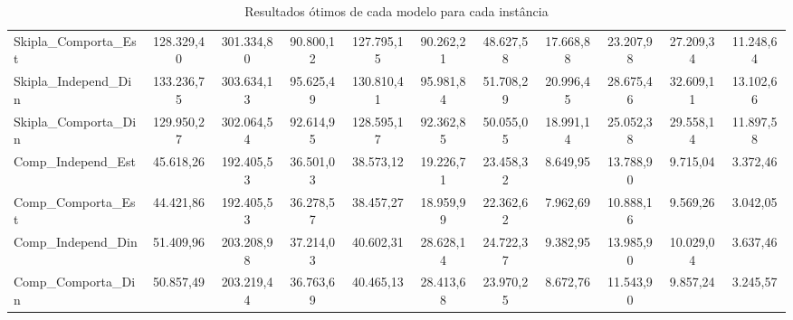 \begin{table}[ht]
{\begin{tabular}{l|c|c|c|c|c|c|c|c|c|c}
			Skipla\_Comporta\_Est  & 128.329,40     & 301.334,80     & 90.800,12      & 127.795,15     & 90.262,21      & 48.627,58      & 17.668,88      & 23.207,98      & 27.209,34      & 11.248,64       \\
			Skipla\_Independ\_Din  & 133.236,75     & 303.634,13     & 95.625,49      & 130.810,41     & 95.981,84      & 51.708,29      & 20.996,45      & 28.675,46      & 32.609,11      & 13.102,66       \\
			Skipla\_Comporta\_Din  & 129.950,27     & 302.064,54     & 92.614,95      & 128.595,17     & 92.362,85      & 50.055,05      & 18.991,14      & 25.052,38      & 29.558,14      & 11.897,58       \\ \hline
			Comp\_Independ\_Est    & 45.618,26      & 192.405,53     & 36.501,03      & 38.573,12      & 19.226,71      & 23.458,32      & 8.649,95       & 13.788,90      & 9.715,04       & 3.372,46        \\
			Comp\_Comporta\_Est    & 44.421,86      & 192.405,53     & 36.278,57      & 38.457,27      & 18.959,99      & 22.362,62      & 7.962,69       & 10.888,16      & 9.569,26       & 3.042,05        \\
			Comp\_Independ\_Din    & 51.409,96      & 203.208,98     & 37.214,03      & 40.602,31      & 28.628,14      & 24.722,37      & 9.382,95       & 13.985,90      & 10.029,04      & 3.637,46        \\
			Comp\_Comporta\_Din    & 50.857,49      & 203.219,44     & 36.763,69      & 40.465,13      & 28.413,68      & 23.970,25      & 8.672,76       & 11.543,90      & 9.857,24       & 3.245,57        \\
			\hline
		\end{tabular}
	}
	\caption{Resultados ótimos de cada modelo para cada instância}
	\label{tab: compara_result_otimos}
\end{table}






